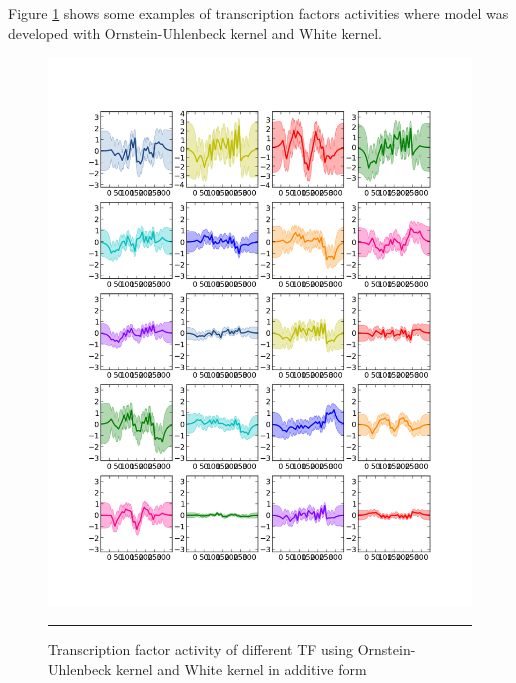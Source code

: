 Figure \ref{fig:TFA_of_20TF} shows some examples of transcription factors activities where
 model was developed with Ornstein-Uhlenbeck kernel and White kernel.

\begin{figure}[]
	\centering
		\includegraphics[width=1.1\textwidth,keepaspectratio]{diagrams/OU20TF.png}
		\rule{35em}{0.5pt}
	\caption[Transcription factor activity of different TF using Ornstein-Uhlenbeck kernel and White kernel]
		{Transcription factor activity of different TF using Ornstein-Uhlenbeck kernel and 
		White kernel in additive form}
	\label{fig:TFA_of_20TF}
\end{figure}


